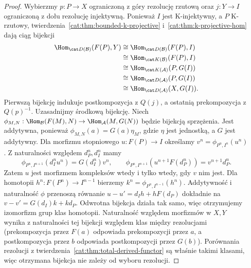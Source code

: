 \begin{proof}
Wybierzmy $p:P\to X$ ograniczoną z góry rezolucję rzutową oraz $j:Y\to I$ ograniczoną z dołu rezolucję injektywną. Ponieważ $I$ jest K-injektywny, a $P$ K-rzutowy, twierdzenia~\ref{cat:thm:bounded-k-projective} i~\ref{cat:thm:k-projective-hom} dają ciąg bijekcji
\[
\begin{aligned}
 \Hom_{\cat D(\mathcal B)}(F(P),Y)
 &\cong\Hom_{\cat D(\mathcal B)}(F(P),I)\\
 &\cong\Hom_{\cat K(\mathcal B)}(F(P),I)\\
 &\cong\Hom_{\cat K(\mathcal A)}(P,G(I))\\
 &\cong\Hom_{\cat D(\mathcal A)}(P,G(I))\\
 &\cong\Hom_{\cat D(\mathcal A)}(X,G(I)).
\end{aligned}
\]
Pierwszą bijekcję indukuje postkompozycja z $Q(j)$, a ostatnią prekompozycja z $Q(p)^{-1}$. Uzasadnijmy środkową bijekcję. Niech $\phi_{M,N}:\Hom_{\mathcal B}(F(M),N)\to\Hom_{\mathcal A}(M,G(N))$ będzie bijekcją sprzężenia. Jest addytywna, ponieważ $\phi_{M,N}(a)=G(a)\eta_M$, gdzie $\eta$ jest jednostką, a $G$ jest addytywny. Dla morfizmu stopniowego $u:F(P)\to I$ określamy $v^n=\phi_{P^n,I^n}(u^n)$. Z naturalności względem $d_P^n,d_I^n$ mamy
\[
 \phi_{P^n,I^{n+1}}(d_I^nu^n)=G(d_I^n)v^n,\qquad
 \phi_{P^n,I^{n+1}}(u^{n+1}F(d_P^n))=v^{n+1}d_P^n.
\]
Zatem $u$ jest morfizmem kompleksów wtedy i tylko wtedy, gdy $v$ nim jest. Dla homotopii $h^n:F(P^n)\to I^{n-1}$ bierzemy $k^n=\phi_{P^n,I^{n-1}}(h^n)$. Addytywność i naturalność $\phi$ przenoszą równanie $u-u'=d_Ih+hF(d_P)$ dokładnie na $v-v'=G(d_I)k+kd_P$. Odwrotna bijekcja działa tak samo, więc otrzymujemy izomorfizm grup klas homotopii. Naturalność względem morfizmów w $X,Y$ wynika z naturalności tej bijekcji względem klas między rezolucjami (prekompozycja przez $F(a)$ odpowiada prekompozycji przez $a$, a postkompozycja przez $b$ odpowiada postkompozycji przez $G(b)$). Porównania rezolucji z twierdzenia~\ref{cat:thm:total-derived-functor} są właśnie takimi klasami, więc otrzymana bijekcja nie zależy od wyboru rezolucji.
\end{proof}

